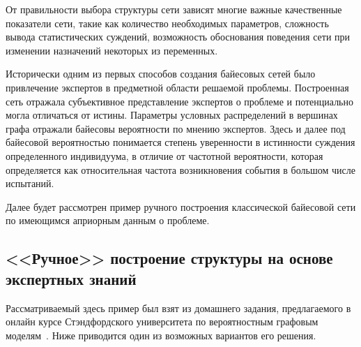 От правильности выбора структуры сети зависят многие важные качественные показатели сети, такие как количество необходимых параметров, сложность вывода статистических суждений, возможность обоснования поведения сети при изменении назначений некоторых из переменных.

Исторически одним из первых способов создания байесовых сетей было привлечение экспертов в предметной области решаемой проблемы.
Построенная сеть отражала субъективное представление экспертов о проблеме и потенциально могла отличаться от истины.
Параметры условных распределений в вершинах графа отражали байесовы вероятности по мнению экспертов.
Здесь и далее под байесовой вероятностью понимается степень уверенности в истинности суждения определенного индивидуума, в отличие от частотной вероятности, которая определяется как относительная частота возникновения события в большом числе испытаний.

Далее будет рассмотрен пример ручного построения классической байесовой сети по имеющимся априорным данным о проблеме.


\subsection{<<Ручное>> построение структуры на основе экспертных знаний}
\label{sub:domain:manual_structure}
Рассматриваемый здесь пример был взят из домашнего задания, предлагаемого в онлайн курсе Стэндфордского университета по вероятностным графовым моделям~\cite{pgm_course}.
Ниже приводится один из возможных вариантов его решения.


